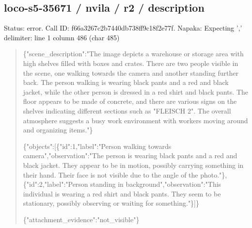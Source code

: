 \documentclass[10pt,a4paper]{article}
\begin{document}
\subsection*{loco-s5-35671 / nvila / r2 / description}
Status: error. Call ID: f66a3267c2b7440db738ff9c18f2e77f. Napaka: Expecting ',' delimiter: line 1 column 486 (char 485)
\begin{quote}\footnotesize
\{"scene\_description":\allowbreak{}"The image depicts a warehouse or storage area with high shelves filled with boxes and crates. There are two people visible in the scene,\allowbreak{} one walking towards the camera and another standing further back. The person walking is wearing black pants and a red and black jacket,\allowbreak{} while the other person is dressed in a red shirt and black pants. The floor appears to be made of concrete,\allowbreak{} and there are various signs on the shelves indicating different sections such as "FLEISCH 2". The overall atmosphere suggests a busy work environment with workers moving around and organizing items."\}\par
\par
\{"objects":\allowbreak{}[\{"id":\allowbreak{}1,\allowbreak{}"label":\allowbreak{}"Per\allowbreak{}son walking towards camera",\allowbreak{}"observation":\allowbreak{}"The person is wearing black pants and a red and black jacket. They appear to be in motion,\allowbreak{} possibly carrying something in their hand. Their face is not visible due to the angle of the photo."\},\allowbreak{}\{"id":\allowbreak{}2,\allowbreak{}"label":\allowbreak{}"Person\allowbreak{} standing in background",\allowbreak{}"observation":\allowbreak{}"This individual is wearing a red shirt and black pants. They seem to be stationary,\allowbreak{} possibly observing or waiting for something."\}]\}\par
\par
\{"attachment\_evidence":\allowbreak{}"not\_visi\allowbreak{}ble"\}
\end{quote}
\end{document}
